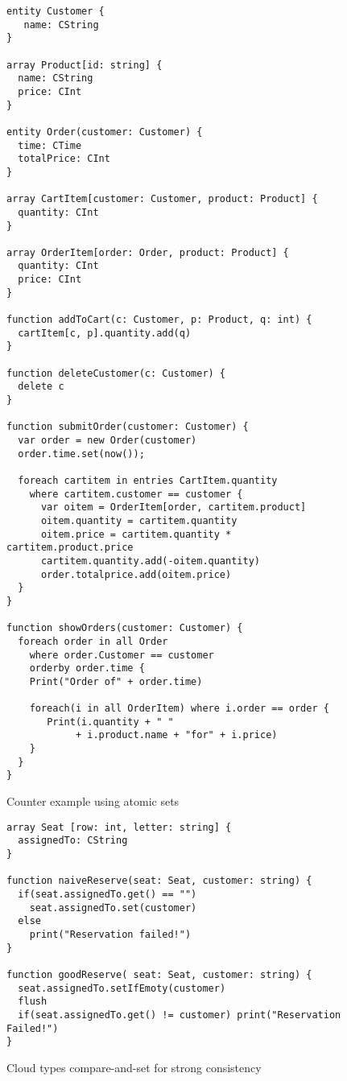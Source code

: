 \begin{figure}[tp]
\begin{lstlisting}
entity Customer {
   name: CString
}

array Product[id: string] {
  name: CString
  price: CInt
}

entity Order(customer: Customer) {
  time: CTime
  totalPrice: CInt
}

array CartItem[customer: Customer, product: Product] {
  quantity: CInt
}

array OrderItem[order: Order, product: Product] {
  quantity: CInt
  price: CInt
}

function addToCart(c: Customer, p: Product, q: int) {
  cartItem[c, p].quantity.add(q)
}

function deleteCustomer(c: Customer) {
  delete c
}

function submitOrder(customer: Customer) {
  var order = new Order(customer)
  order.time.set(now());

  foreach cartitem in entries CartItem.quantity 
    where cartitem.customer == customer {
      var oitem = OrderItem[order, cartitem.product]
      oitem.quantity = cartitem.quantity
      oitem.price = cartitem.quantity * cartitem.product.price
      cartitem.quantity.add(-oitem.quantity)
      order.totalprice.add(oitem.price)
  }
}

function showOrders(customer: Customer) {
  foreach order in all Order
    where order.Customer == customer
    orderby order.time {    
    Print("Order of" + order.time)
    
    foreach(i in all OrderItem) where i.order == order {
       Print(i.quantity + " " 
            + i.product.name + "for" + i.price)
    }
  }
}
\end{lstlisting}
\caption{Counter example using atomic sets}
\label{lst:ctStore}
\end{figure}


\begin{figure}[tp]
\begin{lstlisting}
array Seat [row: int, letter: string] {
  assignedTo: CString
}

function naiveReserve(seat: Seat, customer: string) {
  if(seat.assignedTo.get() == "")
    seat.assignedTo.set(customer)
  else 
    print("Reservation failed!")
}

function goodReserve( seat: Seat, customer: string) {
  seat.assignedTo.setIfEmoty(customer)
  flush
  if(seat.assignedTo.get() != customer) print("Reservation Failed!")
}
\end{lstlisting}
\caption{Cloud types compare-and-set for strong consistency}
\label{lst:acCmpSet}
\end{figure}

